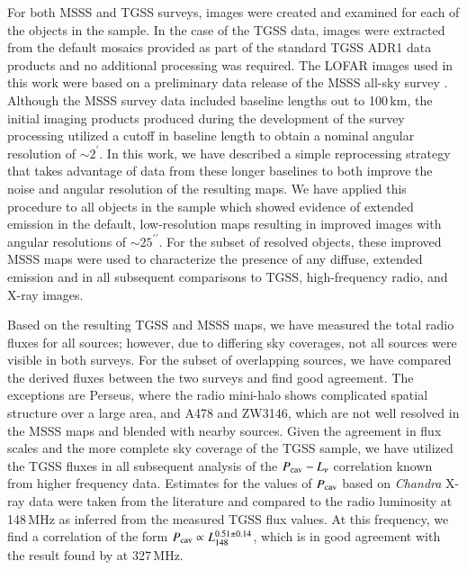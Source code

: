 \documentclass{aa}  %
\begin{document}
For both MSSS and TGSS surveys, images were created and examined for each of the objects in the sample. In the case of the TGSS data, images were extracted from the default mosaics provided as part of the standard TGSS ADR1 data products \citep{Intema2017} and no additional processing was required. The LOFAR images used in this work were based on a preliminary data release of the MSSS all-sky survey \citep{Heald2015}. Although the MSSS survey data included baseline lengths out to 100\,km, the initial imaging products produced during the development of the survey processing utilized a cutoff in baseline length to obtain a nominal angular resolution of $\sim2^{\prime}$. In this work, we have described a simple reprocessing strategy that takes advantage of data from these longer baselines to both improve the noise and angular resolution of the resulting maps. We have applied this procedure to all objects in the sample which showed evidence of extended emission in the default, low-resolution maps resulting in improved images with angular resolutions of $\sim25^{\prime\prime}$. For the subset of resolved objects, these improved MSSS maps were used to characterize the presence of any diffuse, extended emission and in all subsequent comparisons to TGSS, high-frequency radio, and X-ray images.

Based on the resulting TGSS and MSSS maps, we have measured the total radio fluxes for all sources; however, due to differing sky coverages, not all sources were visible in both surveys. For the subset of overlapping sources, we have compared the derived fluxes between the two surveys and find good agreement. The exceptions are Perseus, where the radio mini-halo shows complicated spatial structure over a large area, and A478 and ZW3146, which are not well resolved in the MSSS maps and blended with nearby sources. Given the agreement in flux scales and the more complete sky coverage of the TGSS sample, we have utilized the TGSS fluxes in all subsequent analysis of the $P_{\rm cav} - L_\nu$ correlation known from higher frequency data. Estimates for the values of $P_{\rm cav}$ based on \textit{Chandra} X-ray data were taken from the literature \citep{Rafferty2006} and compared to the radio luminosity at 148\,MHz as inferred from the measured TGSS flux values. At this frequency, we find a correlation of the form $P_{\rm cav} \propto L_{148}^{0.51 \pm 0.14}$, which is in good agreement with the result found by \cite{Birzan2008} at 327\,MHz. 
\end{document}
